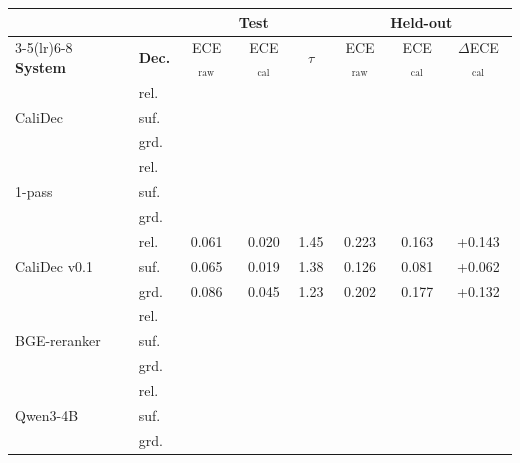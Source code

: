\begin{tabular}{llcccccc}
\toprule
& & \multicolumn{3}{c}{\textbf{Test}} & \multicolumn{3}{c}{\textbf{Held-out}} \\
\cmidrule(lr){3-5}\cmidrule(lr){6-8}
\textbf{System} & \textbf{Dec.} & ECE$_{\mathrm{raw}}$ & ECE$_{\mathrm{cal}}$ & $\tau$ & ECE$_{\mathrm{raw}}$ & ECE$_{\mathrm{cal}}$ & $\Delta$ECE$_{\mathrm{cal}}$ \\
\midrule
\multirow{3}{*}{CaliDec} & rel. & \ph{--} & \ph{--} & \ph{--} & \ph{--} & \ph{--} & \ph{--} \\
 & suf. & \ph{--} & \ph{--} & \ph{--} & \ph{--} & \ph{--} & \ph{--} \\
 & grd. & \ph{--} & \ph{--} & \ph{--} & \ph{--} & \ph{--} & \ph{--} \\
\midrule
\multirow{3}{*}{1-pass} & rel. & \ph{--} & \ph{--} & \ph{--} & \ph{--} & \ph{--} & \ph{--} \\
 & suf. & \ph{--} & \ph{--} & \ph{--} & \ph{--} & \ph{--} & \ph{--} \\
 & grd. & \ph{--} & \ph{--} & \ph{--} & \ph{--} & \ph{--} & \ph{--} \\
\midrule
\multirow{3}{*}{CaliDec v0.1} & rel. & 0.061 & 0.020 & 1.45 & 0.223 & 0.163 & +0.143 \\
 & suf. & 0.065 & 0.019 & 1.38 & 0.126 & 0.081 & +0.062 \\
 & grd. & 0.086 & 0.045 & 1.23 & 0.202 & 0.177 & +0.132 \\
\midrule
\multirow{3}{*}{BGE-reranker} & rel. & \ph{--} & \ph{--} & \ph{--} & \ph{--} & \ph{--} & \ph{--} \\
 & suf. & \ph{--} & \ph{--} & \ph{--} & \ph{--} & \ph{--} & \ph{--} \\
 & grd. & \ph{--} & \ph{--} & \ph{--} & \ph{--} & \ph{--} & \ph{--} \\
\midrule
\multirow{3}{*}{Qwen3-4B} & rel. & \ph{--} & \ph{--} & \ph{--} & \ph{--} & \ph{--} & \ph{--} \\
 & suf. & \ph{--} & \ph{--} & \ph{--} & \ph{--} & \ph{--} & \ph{--} \\
 & grd. & \ph{--} & \ph{--} & \ph{--} & \ph{--} & \ph{--} & \ph{--} \\
\bottomrule
\end{tabular}
